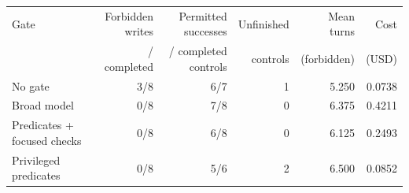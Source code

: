 \begin{tabular}{lrrrrr}
\toprule
Gate & Forbidden writes & Permitted successes & Unfinished & Mean turns & Cost\\
 & / completed & / completed controls & controls & (forbidden) & (USD)\\
\midrule
No gate & 3/8 & 6/7 & 1 & 5.250 & 0.0738 \\
Broad model & 0/8 & 7/8 & 0 & 6.375 & 0.4211 \\
Predicates + focused checks & 0/8 & 6/8 & 0 & 6.125 & 0.2493 \\
Privileged predicates & 0/8 & 5/6 & 2 & 6.500 & 0.0852 \\
\bottomrule
\end{tabular}
